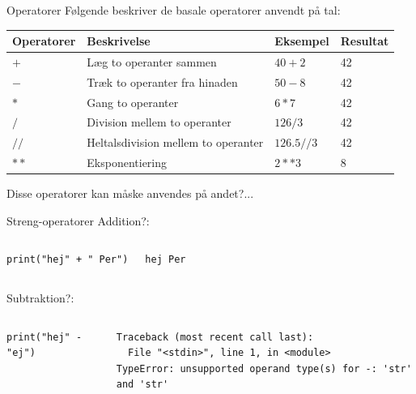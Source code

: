 \documentclass[10pt]{beamer}
\begin{document}
\begin{frame}[fragile]{Operatorer}
	Følgende beskriver de basale operatorer anvendt på tal:
	\begin{center}
		\begin{tabular}{llll}
		\hline
		Operatorer			& 		Beskrivelse								&		Eksempel		&		Resultat	\\ \hline \hline
		$+$					&		Læg to operanter sammen					&		$40+2$			&		42			\\
		$-$					&		Træk to operanter fra hinaden			&		$50-8$			&		42			\\
		$*$					&		Gang to operanter 						&		$6*7$			&		42			\\
		$/$					&		Division mellem to operanter			&		$126/3$			&		42			\\
		$//$				&		Heltalsdivision mellem to operanter		&		$126.5//3$		&		42			\\
		$**$				&		Eksponentiering							&		$2**3$			&		8			\\
		\end{tabular}
	\end{center}
	\vfill
	\pause Disse operatorer kan måske anvendes på andet?...
\end{frame}


\begin{frame}[fragile]{Streng-operatorer}
	Addition?:
	\begin{columns}
		\begin{lstlisting}[style=python]
print("hej" + " Per")
		\end{lstlisting}
		\pause
		\begin{lstlisting}[style=python]
hej Per
		\end{lstlisting}
	\end{columns}
	\pause
	Subtraktion?:
	\begin{columns}
		\column{0.4\textwidth}
		\begin{lstlisting}[style=python]
print("hej" - "ej")
		\end{lstlisting}
		\pause
		\column{0.4\textwidth}
		\begin{lstlisting}[style=python]
Traceback (most recent call last):
  File "<stdin>", line 1, in <module>
TypeError: unsupported operand type(s) for -: 'str' and 'str'
		\end{lstlisting}
	\end{columns}
\end{frame}
\end{document}
